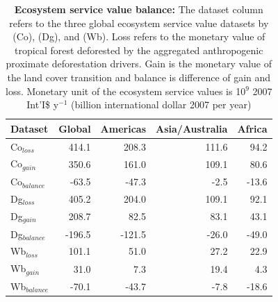 		\begin{table}[ht]
			\centering
			\caption[Ecosystem service value balance]{\textbf{Ecosystem service value balance:} The dataset column refers to the three global ecosystem service value datasets by \citet{Groot2012} (Co), \citet{Costanza2014} (Dg), and \citet{Siikamaki2015} (Wb). Loss refers to the monetary value of tropical forest deforested by the aggregated anthropogenic proximate deforestation drivers. Gain is the monetary value of the land cover transition and balance is difference of gain and loss. Monetary unit of the ecosystem service values is 10$^{9}$ 2007 Int'I\$ y$^{-1}$ (billion international dollar 2007 per year)}
			\label{tab:esv_results}
			\begin{tabular}{lrrrr}
				\hline
				Dataset & Global & Americas & Asia/Australia & Africa \\
				\hline
				Co$_{loss}$ & 414.1 & 208.3 & 111.6 & 94.2\\
				Co$_{gain}$ & 350.6 & 161.0 & 109.1 & 80.6\\
				Co$_{balance}$ & -63.5 & -47.3 & -2.5 & -13.6\\
				Dg$_{loss}$ & 405.2 & 204.0 & 109.1 & 92.1\\
				Dg$_{gain}$ & 208.7 & 82.5 & 83.1 & 43.1\\
				Dg$_{balance}$ & -196.5 & -121.5 & -26.0 & -49.0\\
				Wb$_{loss}$ & 101.1 & 51.0 & 27.2 & 22.9\\
				Wb$_{gain}$ & 31.0 & 7.3 & 19.4 & 4.3\\
				Wb$_{balance}$ & -70.1 & -43.7 & -7.8 & -18.6\\
				\hline
			\end{tabular}
		\end{table}

